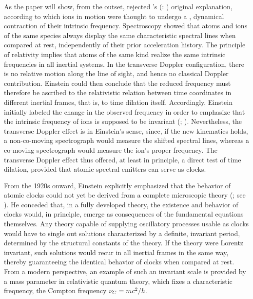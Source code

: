 \documentclass[pdflatex]{sn-jnl}
\newcommand{\tDe}{transverse Doppler effect\xspace}
\renewcommand{\citets}[2][]{\citeauthor{#2}'s (\citeyear{#2}\if\relax\detokenize{#1}\relax\else: #1\fi)}
\begin{document}
As the paper will show, from the outset, \citet{Einstein1907d} rejected \citets{Stark1906} original explanation, according to which ions in motion were thought to undergo a , dynamical contraction of their intrinsic frequency. Spectroscopy showed that atoms and ions of the same species always display the same characteristic spectral lines when compared at rest, independently of their prior acceleration history. The principle of relativity implies that atoms of the same kind realize the same intrinsic frequencies in all inertial systems. In the transverse Doppler configuration, there is no relative motion along the line of sight, and hence no classical Doppler contribution. Einstein could then conclude that the reduced frequency must therefore be ascribed to the relativistic relation between time coordinates in different inertial frames, that is, to time dilation itself. Accordingly, Einstein initially labeled the change in the observed frequency  in order to emphasize that the intrinsic frequency of ions is supposed to be invariant (\citealp[422]{Einstein1908}; \citealp[133]{Einstein1910}). Nevertheless, the \tDe is  in Einstein’s sense, since, if the new kinematics holds, a non-co-moving spectrograph would measure the shifted spectral lines, whereas a co-moving spectrograph would measure the ion’s proper frequency. The transverse Doppler effect thus offered, at least in principle, a direct test of time dilation, provided that atomic spectral emitters can serve as  clocks.

From the 1920s onward, Einstein explicitly emphasized that the behavior of atomic clocks could not yet be derived from a complete microscopic theory (\cite{Einstein1921,Einstein1923,Einstein1924,Einstein1926,Einstein1949}; see \cite{Giovanelli2014a}). He conceded that, in a fully developed theory, the existence and behavior of clocks would, in principle, emerge as consequences of the fundamental equations themselves. Any theory capable of supplying oscillatory processes usable as clocks would have to single out solutions characterized by a definite, invariant period, determined by the structural constants of the theory. If the theory were Lorentz invariant, such solutions would recur in all inertial frames in the same way, thereby guaranteeing the identical behavior of clocks when compared at rest. From a modern perspective, an example of such an invariant scale is provided by a mass parameter in relativistic quantum theory, which fixes a characteristic frequency, the Compton frequency $\nu_C={mc^2}/{h}$.  
\end{document}

